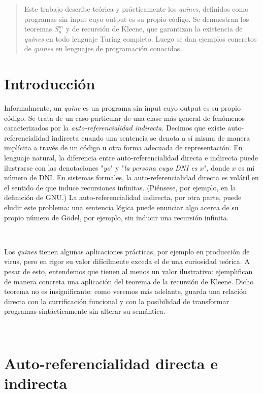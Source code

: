\documentclass[a4paper, 12pt]{article}
\begin{document}
\begin{abstract}
  Este trabajo describe teórica y prácticamente los \textit{quines}, definidos
  como programas sin input cuyo output es su propio código. Se demuestran los
  teoremas $S_n^m$ y de recursión de Kleene, que garantizan la existencia de
  \textit{quines} en todo lenguaje Turing completo. Luego se dan ejemplos
  concretos de \textit{quines} en lenguajes de programación conocidos.
\end{abstract}

\section{Introducción}

Informalmente, un \textit{quine} es un programa sin input cuyo output es su
propio código. Se trata de un caso particular de una clase más general de
fenómenos caracterizados por la \textit{auto-referencialidad indirecta}. Decimos
que existe auto-referencialidad indirecta cuando una sentencia se denota a sí
misma de manera implícita a través de un código u otra forma adecuada de
representación. En lenguaje natural, la diferencia entre auto-referencialidad
directa e indirecta puede ilustrarse con las denotaciones "\textit{yo}" y
"\textit{la persona cuyo DNI es $x$}", donde $x$ es mi número de DNI. En
sistemas formales, la auto-referencialidad directa es volátil en el sentido de
que induce recursiones infinitas. (Piénsese, por ejemplo, en la definición de
GNU.) La auto-referencialidad indirecta, por otra parte, puede eludir este
problema: una sentencia lógica puede enunciar algo acerca de su propio número de
Gödel, por ejemplo, sin inducir una recursión infinita.

~
~ 

Los \textit{quines} tienen algunas aplicaciones prácticas, por ejemplo en
producción de virus, pero en rigor su valor difícilmente exceda el de una
curiosidad teórica. A pesar de esto, entendemos que tienen al menos un valor
ilustrativo: ejemplifican de manera concreta una
aplicación del teorema de la recursión de Kleene. Dicho teorema no es
insignificante: como veremos más adelante, guarda una relación directa con la
currificación funcional y con la posibilidad de transformar programas
sintácticamente sin alterar su semántica.

~




\section{Auto-referencialidad directa e indirecta}
\end{document}
